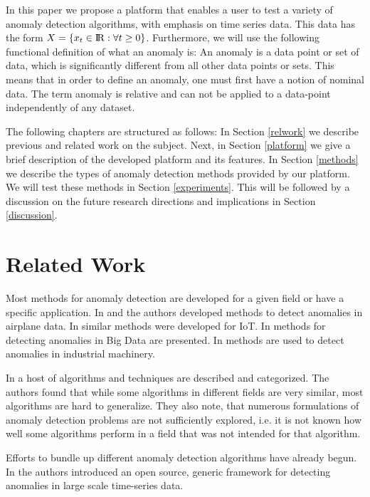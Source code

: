 \documentclass[a4paper, 10pt]{article}
\begin{document}
In this paper we propose a platform that enables a user to test a variety of anomaly detection algorithms, with emphasis on time series data. This data has the form $X = \{x_t \in {\rm I\!R} : \forall t \ge 0\}$. Furthermore, we will use the following functional definition of what an anomaly is: An anomaly is a data point or set of data, which is significantly different from all other data points or sets. This means that in order to define an anomaly, one must first have a notion of nominal data. The term anomaly is relative and can not be applied to a data-point independently of any dataset.

The following chapters are structured as follows: In Section \ref{relwork} we describe previous and related work on the subject. Next, in Section \ref{platform} we give a brief description of the developed platform and its features. In Section \ref{methods} we describe the types of anomaly detection methods provided by our platform. We will test these methods in Section \ref{experiments}. This will be followed by a discussion on the future research directions and implications in Section \ref{discussion}.

\section{Related Work \label{relwork}}

Most methods for anomaly detection are developed for a given field or have a specific application. In \cite{nnfd1994} and \cite{MMAD2006} the authors developed methods to detect anomalies in airplane data. In \cite{ghad2018} similar methods were developed for IoT. In \cite{ADDSCIL} methods for detecting anomalies in Big Data are presented. In \cite{NDTSDII1996} methods are used to detect anomalies in industrial machinery.

In \cite{outlierSurvey2014} a host of algorithms and techniques are described and categorized. The authors found that while some algorithms in different fields are very similar, most algorithms are hard to generalize. They also note, that numerous formulations of anomaly detection problems are not sufficiently explored, i.e. it is not known how well some algorithms perform in a field that was not intended for that algorithm.

Efforts to bundle up different anomaly detection algorithms have already begun. In \cite{egads2015} the authors introduced an open source, generic framework for detecting anomalies in large scale time-series data.
\end{document}
